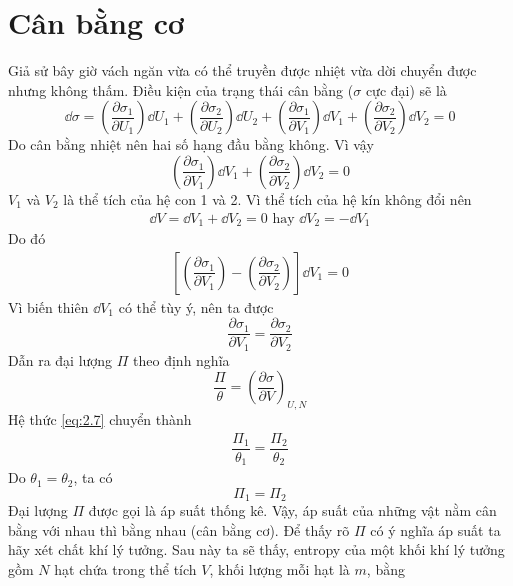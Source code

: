 \section{Cân bằng cơ}
	Giả sử bây giờ vách ngăn vừa có thể truyền được nhiệt vừa dời chuyển được nhưng không thấm. Điều kiện của trạng thái cân bằng ($ \sigma $ cực đại) sẽ là
	\begin{equation*}
		\dd{\sigma} = \left(\dfrac{\partial \sigma_1}{\partial U_1}\right) \dd{U_1} + \left(\dfrac{\partial \sigma_2}{\partial U_2}\right) \dd{U_2} + \left(\dfrac{\partial \sigma_1}{\partial V_1}\right) \dd{V_1} + \left(\dfrac{\partial \sigma_2}{\partial V_2}\right) \dd{V_2} = 0
	\end{equation*}
	Do cân bằng nhiệt nên hai số hạng đầu bằng không. Vì vậy
	\begin{equation*}
		\left(\dfrac{\partial \sigma_1}{\partial V_1}\right) \dd{V_1} + \left(\dfrac{\partial \sigma_2}{\partial V_2}\right) \dd{V_2} = 0
	\end{equation*}
	$ V_1 $ và $ V_2 $ là thể tích của hệ con 1 và 2. Vì thể tích của hệ kín không đổi nên
	\begin{align*}
		\dd{V} = \dd{V_1} + \dd{V_2} = 0 \text{ hay } \dd{V_2} = -\dd{V_1}
	\end{align*}
	Do đó
	\begin{align*}
		\left[\left(\dfrac{\partial \sigma_1}{\partial V_1}\right) - \left(\dfrac{\partial \sigma_2}{\partial V_2}\right)\right] \dd{V_1} = 0
	\end{align*}
	Vì biến thiên $ \dd{V_1} $ có thể tùy ý, nên ta được
	\begin{equation}\label{eq:2.7}
		\dfrac{\partial \sigma_1}{\partial V_1} = \dfrac{\partial \sigma_2}{\partial V_2}
	\end{equation}
	Dẫn ra đại lượng $ \Pi $ theo định nghĩa
	\begin{equation}\label{eq:2.8}
		\dfrac{\Pi}{\theta} = \left(\dfrac{\partial \sigma}{\partial V}\right)_{U,N}
	\end{equation}
	Hệ thức \eqref{eq:2.7} chuyển thành
	\begin{align*}
		\dfrac{\Pi_1}{\theta_1} = \dfrac{\Pi_2}{\theta_2}
	\end{align*}
	Do $ \theta_1 = \theta_2 $, ta có
	\begin{equation}\label{eq:2.9}
		\Pi_1 = \Pi_2
	\end{equation}
	Đại lượng $ \Pi $ được gọi là áp suất thống kê. Vậy, áp suất của những vật nằm cân bằng với nhau thì bằng nhau (cân bằng cơ). Để thấy rõ $ \Pi $ có ý nghĩa áp suất ta hãy xét chất khí lý tưởng. Sau này ta sẽ thấy, entropy của một khối khí lý tưởng gồm $ N $ hạt chứa trong thể tích $ V $, khối lượng mỗi hạt là $ m $, bằng

